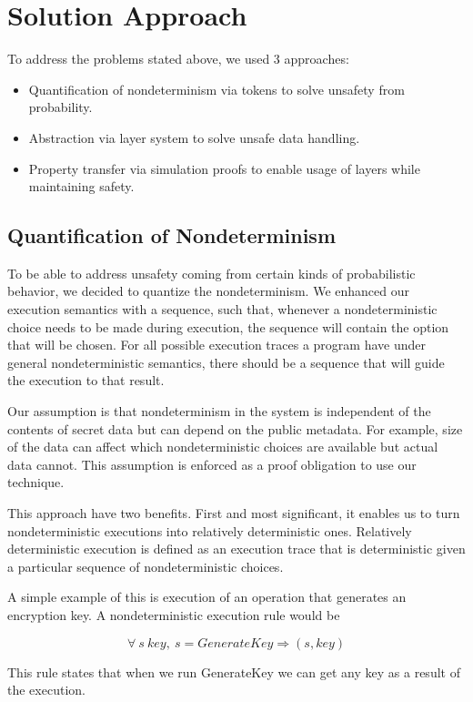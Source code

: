 
\section{Solution Approach}
To address the problems stated above, we used 3 approaches:
\begin{itemize}
	\item Quantification of nondeterminism via tokens to solve unsafety from probability.
	\item Abstraction via layer system to solve unsafe data handling.
	\item Property transfer via simulation proofs to enable usage of layers while maintaining safety.
\end{itemize}


\subsection{Quantification of Nondeterminism}
To be able to address unsafety coming from certain kinds of probabilistic behavior, we decided to quantize the nondeterminism. We enhanced our execution semantics with a sequence, such that, whenever a nondeterministic choice needs to be made during execution, the sequence will contain the option that will be chosen. For all possible execution traces a program have under general nondeterministic semantics, there should be a sequence that will guide the execution to that result. 

Our assumption is that nondeterminism in the system is independent of the contents of secret data but can depend on the public metadata. For example, size of the data can affect which nondeterministic choices are available but actual data cannot. This assumption is enforced as a proof obligation to use our technique.

This approach have two benefits. First and most significant, it enables us to
turn nondeterministic executions into relatively deterministic ones. 
Relatively deterministic execution is defined as an execution trace that is 
deterministic given a particular sequence of nondeterministic choices.

A simple example of this is execution of an operation that generates an encryption key. 
A nondeterministic execution rule would be

$$\forall\ s\ key,\ s  =GenerateKey\Rightarrow (s, key)$$ 

This rule states that when we run GenerateKey we can get any key as a result of the execution.

